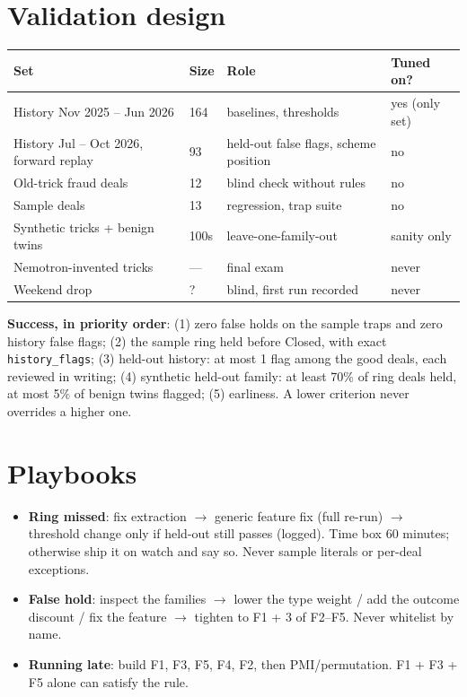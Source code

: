 \documentclass[11pt]{article}
\begin{document}
\section{Validation design}
\begin{center}\small
\begin{tabular}{@{}llll@{}}
\toprule
Set & Size & Role & Tuned on? \\
\midrule
History Nov 2025 -- Jun 2026 & 164 & baselines, thresholds & yes (only set)\\
History Jul -- Oct 2026, forward replay & 93 & held-out false flags, scheme position & no\\
Old-trick fraud deals & 12 & blind check without rules & no\\
Sample deals & 13 & regression, trap suite & no\\
Synthetic tricks + benign twins & 100s & leave-one-family-out & sanity only\\
Nemotron-invented tricks & --- & final exam & never\\
Weekend drop & ? & blind, first run recorded & never\\
\bottomrule
\end{tabular}
\end{center}
\textbf{Success, in priority order}:
(1) zero false holds on the sample traps and zero history false flags;
(2) the sample ring held before Closed, with exact \texttt{history\_flags};
(3) held-out history: at most 1 flag among the good deals, each reviewed in writing;
(4) synthetic held-out family: at least 70\% of ring deals held, at most 5\% of benign twins flagged;
(5) earliness.
A lower criterion never overrides a higher one.

\section{Playbooks}
\begin{itemize}
\item \textbf{Ring missed}: fix extraction $\rightarrow$ generic feature fix (full re-run) $\rightarrow$ threshold change only if held-out still passes (logged). Time box 60 minutes; otherwise ship it on watch and say so. Never sample literals or per-deal exceptions.
\item \textbf{False hold}: inspect the families $\rightarrow$ lower the type weight / add the outcome discount / fix the feature $\rightarrow$ tighten to F1 + 3 of F2--F5. Never whitelist by name.
\item \textbf{Running late}: build F1, F3, F5, F4, F2, then PMI/permutation. F1 + F3 + F5 alone can satisfy the rule.
\end{itemize}
\end{document}
